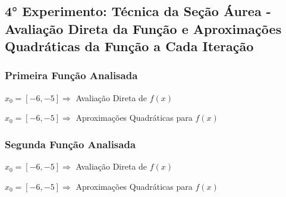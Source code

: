 

\subsection{4° Experimento: Técnica da Seção Áurea - Avaliação Direta da Função e Aproximações Quadráticas da Função a Cada Iteração}
    \subsubsection{Primeira Função Analisada}

        \begin{minipage}[h!]{\linewidth}
            \centering
            $x_0=[-6,-5]\Longrightarrow$  Avaliação Direta de $f(x)$            
            \label{tab:tblt} 
            \writetable{\tblt}\par
            \bigskip
            \centering
            $x_0=[-6,-5]\Longrightarrow$  Aproximações Quadráticas para $f(x)$
            \label{tab:tblu} 
            \writetable{\tblu}
        \end{minipage}
        
    \subsubsection{Segunda Função Analisada}

        \begin{minipage}[h!]{\linewidth}
            \centering
            $x_0=[-6,-5]\Longrightarrow$  Avaliação Direta de $f(x)$            
            \label{tab:tblv} 
            \writetable{\tblv}\par
            \bigskip
            \centering
            $x_0=[-6,-5]\Longrightarrow$  Aproximações Quadráticas para $f(x)$
            \label{tab:tblx} 
            \writetable{\tblx}
        \end{minipage}

\newpage